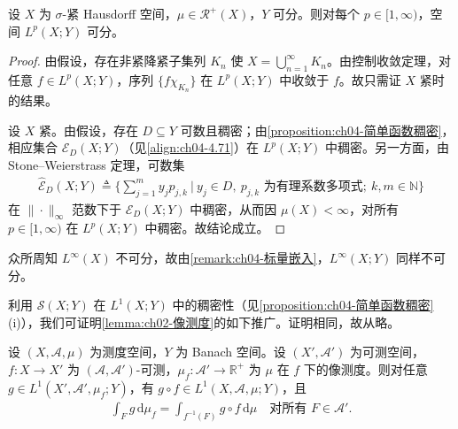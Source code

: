 \documentclass[../../main.tex]{subfiles}%
\begin{document}
\begin{theorem}\label{theorem:ch04-Lp可分}
\label{theorem:ch04-可分}
设 $X$ 为 $\sigma$-紧 Hausdorff 空间，$\mu\in\mathcal{R}^+(X)$，$Y$ 可分。则对每个 $p\in[1,\infty)$，空间 $L^p(X;Y)$ 可分。
\end{theorem}

\begin{proof}
由假设，存在非紧降紧子集列 $K_n$ 使 $X=\bigcup_{n=1}^\infty K_n$。由控制收敛定理，对任意 $f\in L^p(X;Y)$，序列 $\{f\chi_{K_n}\}$ 在 $L^p(X;Y)$ 中收敛于 $f$。故只需证 $X$ 紧时的结果。

设 $X$ 紧。由假设，存在 $D\subseteq Y$ 可数且稠密；由\cref{proposition:ch04-简单函数稠密}，相应集合 $\mathcal{E}_D(X;Y)$（见\eqref{align:ch04-4.71}）在 $L^p(X;Y)$ 中稠密。另一方面，由 Stone--Weierstrass 定理，可数集
\begin{align*}
\widehat{\mathcal{E}}_D(X;Y)\triangleq \Big\{\sum_{j=1}^m y_jp_{j,k}\ \Big|\ y_j\in D,\ p_{j,k}\text{ 为有理系数多项式};\ k,m\in\mathbb{N}\Big\}
\end{align*}
在 $\|\cdot\|_\infty$ 范数下于 $\mathcal{E}_D(X;Y)$ 中稠密，从而因 $\mu(X)<\infty$，对所有 $p\in[1,\infty)$ 在 $L^p(X;Y)$ 中稠密。故结论成立。
\end{proof}

\begin{remark}\label{remark:ch04-L无穷不可分}
众所周知 $L^\infty(X)$ 不可分，故由\cref{remark:ch04-标量嵌入}，$L^\infty(X;Y)$ 同样不可分。
\end{remark}

利用 $\mathcal{S}(X;Y)$ 在 $L^1(X;Y)$ 中的稠密性（见\cref{proposition:ch04-简单函数稠密}(i)），我们可证明\cref{lemma:ch02-像测度}的如下推广。证明相同，故从略。

\begin{proposition}[变量替换公式]\label{proposition:ch04-像测度积分}
设 $(X,\mathcal{A},\mu)$ 为测度空间，$Y$ 为 Banach 空间。设 $(X',\mathcal{A}')$ 为可测空间，$f:X\to X'$ 为 $(\mathcal{A},\mathcal{A}')$-可测，$\mu_f:\mathcal{A}'\to\mathbb{R}^+$ 为 $\mu$ 在 $f$ 下的像测度。则对任意 $g\in L^1(X',\mathcal{A}',\mu_f;Y)$，有 $g\circ f\in L^1(X,\mathcal{A},\mu;Y)$，且
\begin{align}
\int_F g\,\mathrm{d}\mu_f=\int_{f^{-1}(F)}g\circ f\,\mathrm{d}\mu\quad\text{对所有 }F\in\mathcal{A}'. \label{align:ch04-4.72}
\end{align}
\end{proposition}
\end{document}
